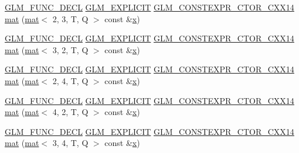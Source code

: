 \begin{DoxyCompactItemize}
\item 
\hyperlink{setup_8hpp_ab2d052de21a70539923e9bcbf6e83a51}{G\+L\+M\+\_\+\+F\+U\+N\+C\+\_\+\+D\+E\+CL} \hyperlink{setup_8hpp_a6c74f5a5e7b134ab69023ff9a30d4d5d}{G\+L\+M\+\_\+\+E\+X\+P\+L\+I\+C\+IT} \hyperlink{setup_8hpp_a0900f9145e68bf6061b6f5e7be3fa751}{G\+L\+M\+\_\+\+C\+O\+N\+S\+T\+E\+X\+P\+R\+\_\+\+C\+T\+O\+R\+\_\+\+C\+X\+X14} \hyperlink{structglm_1_1mat_3_013_00_013_00_01_t_00_01_q_01_4_ab16629a8e424466ad4f5d60c7fe2392f}{mat} (\hyperlink{structglm_1_1mat}{mat}$<$ 2, 3, T, Q $>$ const \&\hyperlink{_s_d_l__opengl_8h_ad0e63d0edcdbd3d79554076bf309fd47}{x})
\item 
\hyperlink{setup_8hpp_ab2d052de21a70539923e9bcbf6e83a51}{G\+L\+M\+\_\+\+F\+U\+N\+C\+\_\+\+D\+E\+CL} \hyperlink{setup_8hpp_a6c74f5a5e7b134ab69023ff9a30d4d5d}{G\+L\+M\+\_\+\+E\+X\+P\+L\+I\+C\+IT} \hyperlink{setup_8hpp_a0900f9145e68bf6061b6f5e7be3fa751}{G\+L\+M\+\_\+\+C\+O\+N\+S\+T\+E\+X\+P\+R\+\_\+\+C\+T\+O\+R\+\_\+\+C\+X\+X14} \hyperlink{structglm_1_1mat_3_013_00_013_00_01_t_00_01_q_01_4_afe6ba7fd1758c0e3a05c4119a8f86016}{mat} (\hyperlink{structglm_1_1mat}{mat}$<$ 3, 2, T, Q $>$ const \&\hyperlink{_s_d_l__opengl_8h_ad0e63d0edcdbd3d79554076bf309fd47}{x})
\item 
\hyperlink{setup_8hpp_ab2d052de21a70539923e9bcbf6e83a51}{G\+L\+M\+\_\+\+F\+U\+N\+C\+\_\+\+D\+E\+CL} \hyperlink{setup_8hpp_a6c74f5a5e7b134ab69023ff9a30d4d5d}{G\+L\+M\+\_\+\+E\+X\+P\+L\+I\+C\+IT} \hyperlink{setup_8hpp_a0900f9145e68bf6061b6f5e7be3fa751}{G\+L\+M\+\_\+\+C\+O\+N\+S\+T\+E\+X\+P\+R\+\_\+\+C\+T\+O\+R\+\_\+\+C\+X\+X14} \hyperlink{structglm_1_1mat_3_013_00_013_00_01_t_00_01_q_01_4_a3237a0dea9f39b785f50e35fc9a4d2fa}{mat} (\hyperlink{structglm_1_1mat}{mat}$<$ 2, 4, T, Q $>$ const \&\hyperlink{_s_d_l__opengl_8h_ad0e63d0edcdbd3d79554076bf309fd47}{x})
\item 
\hyperlink{setup_8hpp_ab2d052de21a70539923e9bcbf6e83a51}{G\+L\+M\+\_\+\+F\+U\+N\+C\+\_\+\+D\+E\+CL} \hyperlink{setup_8hpp_a6c74f5a5e7b134ab69023ff9a30d4d5d}{G\+L\+M\+\_\+\+E\+X\+P\+L\+I\+C\+IT} \hyperlink{setup_8hpp_a0900f9145e68bf6061b6f5e7be3fa751}{G\+L\+M\+\_\+\+C\+O\+N\+S\+T\+E\+X\+P\+R\+\_\+\+C\+T\+O\+R\+\_\+\+C\+X\+X14} \hyperlink{structglm_1_1mat_3_013_00_013_00_01_t_00_01_q_01_4_abda8ab08aa2cb2d71951774276c68abf}{mat} (\hyperlink{structglm_1_1mat}{mat}$<$ 4, 2, T, Q $>$ const \&\hyperlink{_s_d_l__opengl_8h_ad0e63d0edcdbd3d79554076bf309fd47}{x})
\item 
\hyperlink{setup_8hpp_ab2d052de21a70539923e9bcbf6e83a51}{G\+L\+M\+\_\+\+F\+U\+N\+C\+\_\+\+D\+E\+CL} \hyperlink{setup_8hpp_a6c74f5a5e7b134ab69023ff9a30d4d5d}{G\+L\+M\+\_\+\+E\+X\+P\+L\+I\+C\+IT} \hyperlink{setup_8hpp_a0900f9145e68bf6061b6f5e7be3fa751}{G\+L\+M\+\_\+\+C\+O\+N\+S\+T\+E\+X\+P\+R\+\_\+\+C\+T\+O\+R\+\_\+\+C\+X\+X14} \hyperlink{structglm_1_1mat_3_013_00_013_00_01_t_00_01_q_01_4_ac885d2f9ac727a71837555c1c9543a49}{mat} (\hyperlink{structglm_1_1mat}{mat}$<$ 3, 4, T, Q $>$ const \&\hyperlink{_s_d_l__opengl_8h_ad0e63d0edcdbd3d79554076bf309fd47}{x})

\end{DoxyCompactItemize}
